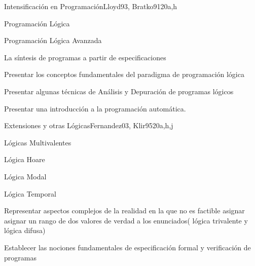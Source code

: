 \begin{syllabus}
\begin{unit}{Intensificación en Programación}{}{Lloyd93, Bratko91}{20}{a,h}
   \begin{topics}
         \item Programación Lógica
         \item Programación Lógica Avanzada
         \item La síntesis de programas a partir de especificaciones
   \end{topics}

   \begin{learningoutcomes}
         \item Presentar los conceptos fundamentales del paradigma de programación lógica
         \item Presentar algunas técnicas de Análisis y Depuración de programas lógicos
         \item Presentar una introducción a la programación automática.
   \end{learningoutcomes}
\end{unit}

\begin{unit}{Extensiones y otras Lógicas}{}{Fernandez03, Klir95}{20}{a,h,j}
   \begin{topics}
      \item Lógicas Multivalentes
      \item Lógica Hoare
      \item Lógica Modal
      \item Lógica Temporal
   \end{topics}

   \begin{learningoutcomes}
      \item Representar aspectos complejos de la realidad en la que no es factible asignar asignar un rango de dos valores de verdad a los enunciados( lógica trivalente y lógica difusa)
      \item Establecer las nociones fundamentales de especificación formal y verificación de programas
   \end{learningoutcomes}
\end{unit}

\begin{coursebibliography}
\end{coursebibliography}

\end{syllabus}

%
